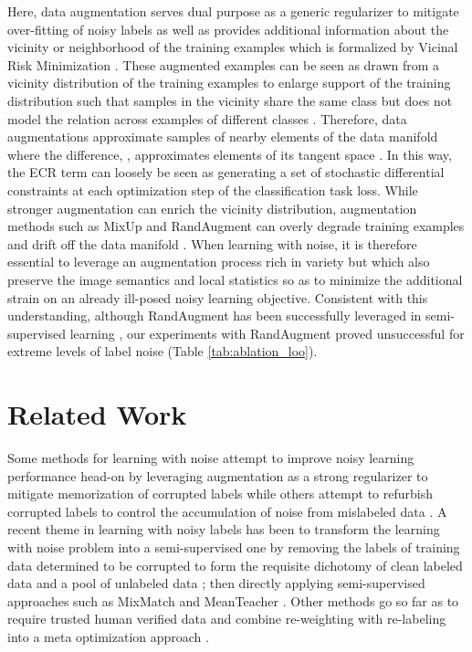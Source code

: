 \documentclass{article}
\begin{document}
Here, data augmentation serves dual purpose as a generic regularizer to mitigate over-fitting of noisy labels \cite{zhang2018mixup} as well as provides additional information about the vicinity or neighborhood of the training examples which is formalized by Vicinal Risk Minimization \cite{NIPS2000_ba9a56ce}. These augmented examples can be seen as drawn from a vicinity distribution of the training examples to enlarge support of the training distribution such that samples in the vicinity share the same class but does not model the relation across examples of different classes \cite{zhang2018mixup}.  Therefore, data augmentations approximate samples of nearby elements of the data manifold where the difference, , approximates elements of its tangent space \cite{athiwaratkun2018there}.  In this way, the ECR term can loosely be seen as generating a set of stochastic differential constraints at each optimization step of the classification task loss.  While stronger augmentation can enrich the vicinity distribution, augmentation methods such as MixUp \cite{zhang2018mixup} and RandAugment \cite{DBLP:conf/cvpr/CubukZSL20} can overly degrade training examples and drift off the data manifold \cite{hendrycks2020augmix}.  When learning with noise, it is therefore essential to leverage an augmentation process rich in variety but which also preserve the image semantics and local statistics so as to minimize the additional strain on an already ill-posed noisy learning objective.  Consistent with this understanding, although RandAugment has been successfully leveraged in semi-supervised learning \cite{Berthelot2020ReMixMatch:,49534,2019arXiv190412848X}, our experiments with RandAugment proved unsuccessful for extreme levels of label noise (Table \ref{tab:ablation_loo}).



\section{Related Work}

Some methods for learning with noise attempt to improve noisy learning performance head-on by leveraging augmentation as a strong regularizer to mitigate memorization of corrupted labels \cite{zhang2018mixup} while others attempt to refurbish corrupted labels to control the accumulation of noise from mislabeled data \cite{song2019}.  A recent theme in learning with noisy labels has been to transform the learning with noise problem into a semi-supervised one by removing the labels of training data determined to be corrupted to form the requisite dichotomy of clean labeled data and a pool of unlabeled data \cite{nguyen2020,li2020}; then directly applying semi-supervised approaches such as MixMatch \cite{48557} and MeanTeacher \cite{tarvainen2017}.  Other methods go so far as to require trusted human verified data and combine re-weighting with re-labeling into a meta optimization approach \cite{zhang2020}.  
\end{document}
